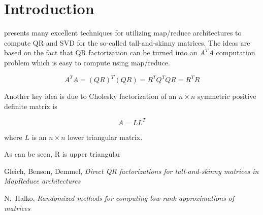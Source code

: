 \message{ !name(mr_svd.tex)}\documentclass[11pt]{article}
\begin{document}
\section{Introduction}

\cite{gleich} presents many excellent techniques for utilizing map/reduce
architectures to compute QR and SVD for the so-called tall-and-skinny
matrices. The ideas are based on the fact that QR factorization can be
turned into an $A^TA$ computation problem which is easy to compute using
map/reduce. 

$$ A^TA = (QR)^T(QR) = R^TQ^TQR = R^TR $$

Another key idea is due to Cholesky factorization of an $n \times n$
symmetric positive definite matrix is

$$ A = LL^T $$

where $L$ is an $n \times n$ lower triangular matrix. 

As can be seen, R is upper triangular 

\begin{thebibliography}{1}

Gleich, Benson, Demmel, \emph{Direct QR factorizations for tall-and-skinny matrices in MapReduce architectures}

N.~Halko, \emph{Randomized methods for computing low-rank approximations of matrices}

\end{thebibliography}

\end{document}
